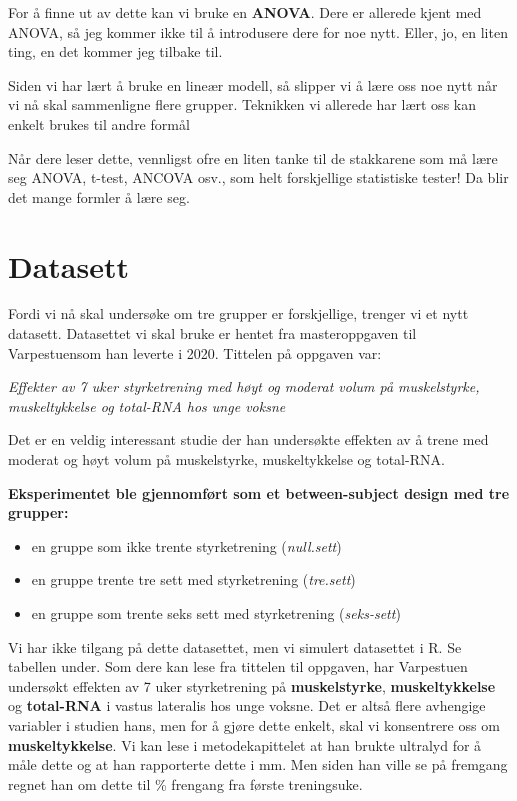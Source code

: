 \documentclass[
]{book}
\providecommand{\tightlist}{%
  \setlength{\itemsep}{0pt}\setlength{\parskip}{0pt}}
\begin{document}
For å finne ut av dette kan vi bruke en \textbf{ANOVA}. Dere er allerede kjent med ANOVA, så jeg kommer ikke til å introdusere dere for noe nytt. Eller, jo, en liten ting, en det kommer jeg tilbake til.

Siden vi har lært å bruke en lineær modell, så slipper vi å lære oss noe nytt når vi nå skal sammenligne flere grupper. Teknikken vi allerede har lært oss kan enkelt brukes til andre formål

Når dere leser dette, vennligst ofre en liten tanke til de stakkarene som må lære seg ANOVA, t-test, ANCOVA osv., som helt forskjellige statistiske tester! Da blir det mange formler å lære seg.

\hypertarget{datasett-1}{%
\section{Datasett}\label{datasett-1}}

Fordi vi nå skal undersøke om tre grupper er forskjellige, trenger vi et nytt datasett. Datasettet vi skal bruke er hentet fra masteroppgaven til Varpestuensom han leverte i 2020. Tittelen på oppgaven var:

\emph{Effekter av 7 uker styrketrening med høyt og moderat volum på muskelstyrke, muskeltykkelse og total-RNA hos unge voksne}

Det er en veldig interessant studie der han undersøkte effekten av å trene med moderat og høyt volum på muskelstyrke, muskeltykkelse og total-RNA.

\textbf{Eksperimentet ble gjennomført som et between-subject design med tre grupper:}

\begin{itemize}
\tightlist
\item
  en gruppe som ikke trente styrketrening (\emph{null.sett})
\item
  en gruppe trente tre sett med styrketrening (\emph{tre.sett})
\item
  en gruppe som trente seks sett med styrketrening (\emph{seks-sett})
\end{itemize}

Vi har ikke tilgang på dette datasettet, men vi simulert datasettet i R. Se tabellen under. Som dere kan lese fra tittelen til oppgaven, har Varpestuen undersøkt effekten av 7 uker styrketrening på \textbf{muskelstyrke}, \textbf{muskeltykkelse} og \textbf{total-RNA} i vastus lateralis hos unge voksne. Det er altså flere avhengige variabler i studien hans, men for å gjøre dette enkelt, skal vi konsentrere oss om \textbf{muskeltykkelse}. Vi kan lese i metodekapittelet at han brukte ultralyd for å måle dette og at han rapporterte dette i mm. Men siden han ville se på fremgang regnet han om dette til \% frengang fra første treningsuke.
\end{document}
